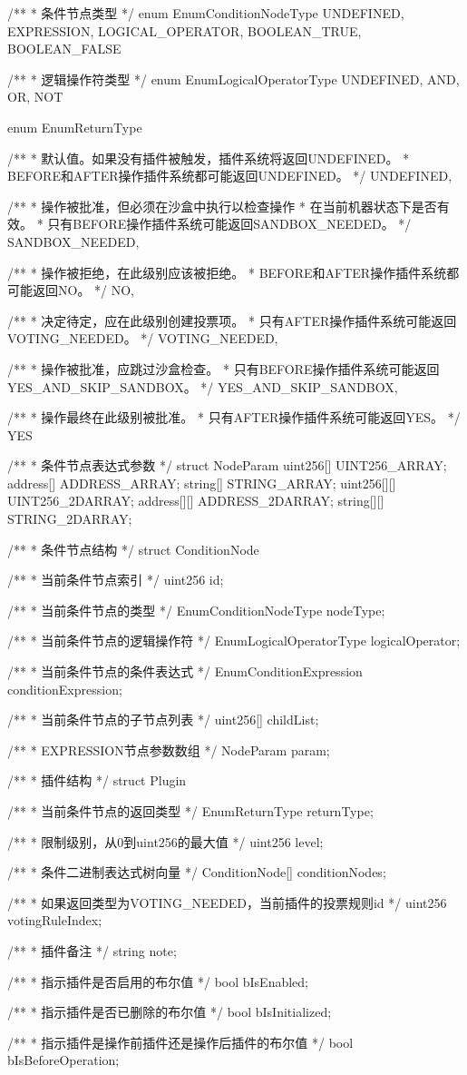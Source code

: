 \documentclass[main.tex]{subfiles}
\begin{document}
\begin{spverbatim}
/** 
  * 条件节点类型
  */
enum EnumConditionNodeType { UNDEFINED, EXPRESSION, LOGICAL_OPERATOR, BOOLEAN_TRUE, BOOLEAN_FALSE}

/**
  * 逻辑操作符类型
  */
enum EnumLogicalOperatorType {UNDEFINED, AND, OR, NOT }


enum EnumReturnType { 

  /**
   * 默认值。如果没有插件被触发，插件系统将返回UNDEFINED。
   * BEFORE和AFTER操作插件系统都可能返回UNDEFINED。
   */
  UNDEFINED,   


  /**
   * 操作被批准，但必须在沙盒中执行以检查操作
   * 在当前机器状态下是否有效。
   * 只有BEFORE操作插件系统可能返回SANDBOX_NEEDED。
   */
  SANDBOX_NEEDED,  

  /**
   * 操作被拒绝，在此级别应该被拒绝。
   * BEFORE和AFTER操作插件系统都可能返回NO。
   */
  NO, 

  /**
   * 决定待定，应在此级别创建投票项。
   * 只有AFTER操作插件系统可能返回VOTING_NEEDED。
   */
  VOTING_NEEDED, 

  /**
   * 操作被批准，应跳过沙盒检查。
   * 只有BEFORE操作插件系统可能返回YES_AND_SKIP_SANDBOX。
   */
  YES_AND_SKIP_SANDBOX,

  /**
   * 操作最终在此级别被批准。
   * 只有AFTER操作插件系统可能返回YES。
   */
  YES 
}

/**
  * 条件节点表达式参数
  */
struct NodeParam {
  uint256[] UINT256_ARRAY;
  address[] ADDRESS_ARRAY;
  string[] STRING_ARRAY;
  uint256[][] UINT256_2DARRAY;
  address[][] ADDRESS_2DARRAY;
  string[][] STRING_2DARRAY;
}

/**
  * 条件节点结构
  */
struct ConditionNode {
  /**
   * 当前条件节点索引
   */
  uint256 id;

  /**
   * 当前条件节点的类型
   */
  EnumConditionNodeType nodeType;

  /**
   * 当前条件节点的逻辑操作符
   */
  EnumLogicalOperatorType logicalOperator;

  /**
   * 当前条件节点的条件表达式
   */
  EnumConditionExpression conditionExpression;

  /**
   * 当前条件节点的子节点列表
   */
  uint256[] childList;

  /**
   * EXPRESSION节点参数数组
   */
  NodeParam param;
}

/** 
  * 插件结构
  */
struct Plugin {
  /**
   * 当前条件节点的返回类型
   */
  EnumReturnType returnType;

  /**
   * 限制级别，从0到uint256的最大值
   */
  uint256 level;

  /**
   * 条件二进制表达式树向量
   */
  ConditionNode[] conditionNodes;

  /**
   * 如果返回类型为VOTING_NEEDED，当前插件的投票规则id
   */
  uint256 votingRuleIndex;

  /**
   * 插件备注
   */
  string note;

  /**
   * 指示插件是否启用的布尔值
   */
  bool bIsEnabled;

  /**
   * 指示插件是否已删除的布尔值
   */
  bool bIsInitialized;

  /**
   * 指示插件是操作前插件还是操作后插件的布尔值
   */
  bool bIsBeforeOperation;
  
}
\end{spverbatim}
\end{document}
